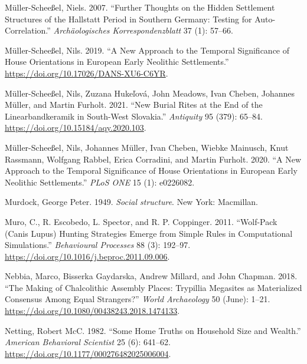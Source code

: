 \documentclass[
  12pt,
  a4paper, twoside]{book}
\newlength{\cslhangindent}
\newlength{\cslentryspacingunit} %
\newenvironment{CSLReferences}[2] %
 {%
  \setlength{\parindent}{0pt}
  \ifodd #1
  \let\oldpar\par
  \def\par{\hangindent=\cslhangindent\oldpar}
  \fi
  \setlength{\parskip}{#2\cslentryspacingunit}
 }%
 {}
\begin{document}
\begin{CSLReferences}{1}{0}
\leavevmode{}%
Müller-Scheeßel, Niels. 2007. {``Further Thoughts on the Hidden Settlement Structures of the Hallstatt Period in Southern Germany: Testing for Auto-Correlation.''} \emph{Archäologisches Korrespondenzblatt} 37 (1): 57--66.

\leavevmode{}%
Müller-Scheeßel, Nils. 2019. {``A New Approach to the Temporal Significance of House Orientations in European Early Neolithic Settlements.''} \url{https://doi.org/10.17026/DANS-XU6-C6YR}.

\leavevmode{}%
Müller-Scheeßel, Nils, Zuzana Hukeľová, John Meadows, Ivan Cheben, Johannes Müller, and Martin Furholt. 2021. {``New Burial Rites at the End of the {Linearbandkeramik} in South-West {Slovakia}.''} \emph{Antiquity} 95 (379): 65--84. \url{https://doi.org/10.15184/aqy.2020.103}.

\leavevmode{}%
Müller-Scheeßel, Nils, Johannes Müller, Ivan Cheben, Wiebke Mainusch, Knut Rassmann, Wolfgang Rabbel, Erica Corradini, and Martin Furholt. 2020. {``A New Approach to the Temporal Significance of House Orientations in European Early Neolithic Settlements.''} \emph{PLoS ONE} 15 (1): e0226082.

\leavevmode{}%
Murdock, George Peter. 1949. \emph{Social structure}. New York: Macmillan.

\leavevmode{}%
Muro, C., R. Escobedo, L. Spector, and R. P. Coppinger. 2011. {``Wolf-Pack (Canis Lupus) Hunting Strategies Emerge from Simple Rules in Computational Simulations.''} \emph{Behavioural Processes} 88 (3): 192--97. \url{https://doi.org/10.1016/j.beproc.2011.09.006}.

\leavevmode{}%
Nebbia, Marco, Bisserka Gaydarska, Andrew Millard, and John Chapman. 2018. {``The Making of Chalcolithic Assembly Places: Trypillia Megasites as Materialized Consensus Among Equal Strangers?''} \emph{World Archaeology} 50 (June): 1--21. \url{https://doi.org/10.1080/00438243.2018.1474133}.

\leavevmode{}%
Netting, Robert McC. 1982. {``Some Home Truths on Household Size and Wealth.''} \emph{American Behavioral Scientist} 25 (6): 641--62. \url{https://doi.org/10.1177/000276482025006004}.


\end{CSLReferences}
\end{document}
